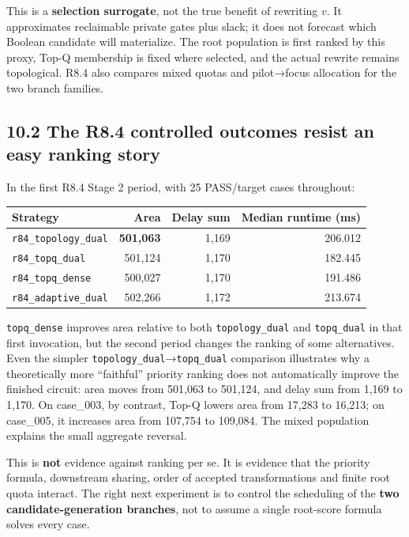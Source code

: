 This is a \textbf{selection surrogate}, not the true benefit of rewriting \(v\). It approximates reclaimable private gates plus slack; it does not forecast which Boolean candidate will materialize. The root population is first ranked by this proxy, Top-Q membership is fixed where selected, and the actual rewrite remains topological. R8.4 also compares mixed quotas and pilot→focus allocation for the two branch families.

\subsection{10.2 The R8.4 controlled outcomes resist an easy ranking story}\label{the-r8.4-controlled-outcomes-resist-an-easy-ranking-story}

In the first R8.4 Stage 2 period, with 25 PASS/target cases throughout:

\begin{longtable}[]{@{}lrrr@{}}
\toprule\noalign{}
Strategy & Area & Delay sum & Median runtime (ms) \\
\midrule\noalign{}
\endhead
\bottomrule\noalign{}
\endlastfoot
\texttt{r84\_topology\_dual} & \textbf{501,063} & 1,169 & 206.012 \\
\texttt{r84\_topq\_dual} & 501,124 & 1,170 & 182.445 \\
\texttt{r84\_topq\_dense} & 500,027 & 1,170 & 191.486 \\
\texttt{r84\_adaptive\_dual} & 502,266 & 1,172 & 213.674 \\
\end{longtable}

\texttt{topq\_dense} improves area relative to both \texttt{topology\_dual} and \texttt{topq\_dual} in that first invocation, but the second period changes the ranking of some alternatives. Even the simpler \texttt{topology\_dual}→\texttt{topq\_dual} comparison illustrates why a theoretically more ``faithful'' priority ranking does not automatically improve the finished circuit: area moves from 501,063 to 501,124, and delay sum from 1,169 to 1,170. On case\_003, by contrast, Top-Q lowers area from 17,283 to 16,213; on case\_005, it increases area from 107,754 to 109,084. The mixed population explains the small aggregate reversal.

This is \textbf{not} evidence against ranking per se. It is evidence that the priority formula, downstream sharing, order of accepted transformations and finite root quota interact. The right next experiment is to control the scheduling of the \textbf{two candidate-generation branches}, not to assume a single root-score formula solves every case.

